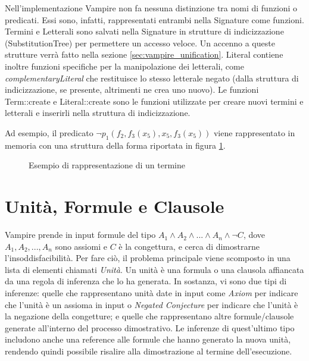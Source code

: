 \documentclass[./main.tex]{subfiles}
\begin{document}
Nell'implementazione Vampire non fa nessuna distinzione tra nomi di funzioni o predicati. Essi sono, infatti, rappresentati
entrambi nella Signature come funzioni. 
Termini e Letterali sono salvati nella Signature in strutture di indicizzazione (SubstitutionTree) per permettere un accesso veloce.
Un accenno a queste strutture verrà fatto nella sezione \ref{sec:vampire_unification}.
Literal contiene inoltre funzioni specifiche per la manipolazione dei letterali, come \textit{complementaryLiteral} 
che restituisce lo stesso letterale negato (dalla struttura di indicizzazione, se presente, altrimenti ne crea uno nuovo).
Le funzioni Term::create e Literal::create sono le funzioni utilizzate per creare nuovi termini e letterali e inserirli nella struttura di indicizzazione.

Ad esempio, il predicato $\lnot p_1(f_2,f_3(x_5), x_5, f_3(x_5))$ viene rappresentato in memoria con una struttura della forma riportata in figura \ref{fig:vampire_term_example}.

\begin{figure}[H]
    \centering
    \scalebox{0.55}{    
        
    }
    \caption{Esempio di rappresentazione di un termine}
    \label{fig:vampire_term_example}
\end{figure}




\section{Unità, Formule e Clausole} \label{sec:vampire_formula}
Vampire prende in input formule del tipo $A_1 \land A_2 \land ... \land A_n \land \lnot C$,
dove $A_1, A_2, ..., A_n$ sono assiomi e $C$ è la congettura,
e cerca di dimostrarne l'insoddisfacibilità.
Per fare ciò, il problema principale viene scomposto in una lista di elementi chiamati \textit{Unità}.
Un unità è una formula o una clausola affiancata da una regola di inferenza che lo ha generata.
In sostanza, vi sono due tipi di inferenze: quelle che rappresentano unità date in input
come \textit{Axiom} per indicare che l'unità è un assioma in input o
\textit{Negated Conjecture} per indicare che l'unità è la negazione della congetture;
e quelle che rappresentano altre formule/clausole generate all'interno del processo dimostrativo.
Le inferenze di quest'ultimo tipo includono anche una reference alle formule che hanno generato la nuova unità,
rendendo quindi possibile risalire alla dimostrazione al termine dell'esecuzione.
\end{document}
